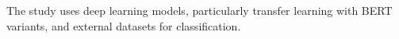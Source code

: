 The study uses deep learning models, particularly transfer learning with BERT variants, and external datasets for classification.